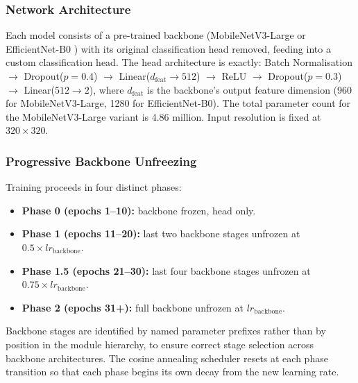 \documentclass[journal,twoside,web]{ieeecolor}
\begin{document}
\subsubsection{Network Architecture}
Each model consists of a pre-trained backbone (MobileNetV3-Large \cite{b_howard2019} or EfficientNet-B0 \cite{b12}) with its original classification head removed, feeding into a custom classification head. The head architecture is exactly: Batch Normalisation $\rightarrow$ Dropout($p=0.4$) $\rightarrow$ Linear($d_{\mathrm{feat}} \rightarrow 512$) $\rightarrow$ ReLU $\rightarrow$ Dropout($p=0.3$) $\rightarrow$ Linear($512 \rightarrow 2$), where $d_{\mathrm{feat}}$ is the backbone's output feature dimension (960 for MobileNetV3-Large, 1280 for EfficientNet-B0). The total parameter count for the MobileNetV3-Large variant is 4.86 million. Input resolution is fixed at $320 \times 320$.

\subsubsection{Progressive Backbone Unfreezing}
Training proceeds in four distinct phases:
\begin{itemize}
\item \textbf{Phase 0 (epochs 1--10):} backbone frozen, head only.
\item \textbf{Phase 1 (epochs 11--20):} last two backbone stages unfrozen at $0.5 \times lr_{\mathrm{backbone}}$.
\item \textbf{Phase 1.5 (epochs 21--30):} last four backbone stages unfrozen at $0.75 \times lr_{\mathrm{backbone}}$.
\item \textbf{Phase 2 (epochs 31+):} full backbone unfrozen at $lr_{\mathrm{backbone}}$.
\end{itemize}
Backbone stages are identified by named parameter prefixes rather than by position in the module hierarchy, to ensure correct stage selection across backbone architectures. The cosine annealing scheduler resets at each phase transition so that each phase begins its own decay from the new learning rate.
\end{document}

